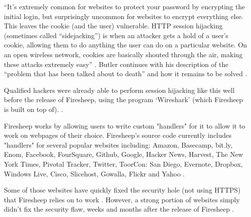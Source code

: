 \documentclass[11pt]{article}
\begin{document}
\begin{multicols}{2}
``It's extremely common for websites to protect your password by encrypting the initial login, but surprisingly uncommon for websites to encrypt everything else. This leaves the cookie (and the user) vulnerable. HTTP session hijacking (sometimes called ``sidejacking'') is when an attacker gets a hold of a user's cookie, allowing them to do anything the user can do on a particular website. On an open wireless network, cookies are basically shouted through the air, making these attacks extremely easy'' \cite{eric-butler}. Butler continues with his description of the ``problem that has been talked about to death'' and how it remains to be solved \cite{eric-butler}. 

Qualified hackers were already able to perform session hijacking like this well before the release of Firesheep, using the program `Wireshark' (which Firesheep is built on top of). \cite{wireshark}.

Firesheep works by allowing users to write custom "handlers" for it to allow it to work on webpages of their choice. Firesheep's source code currently includes "handlers" for several popular websites including: Amazon, Basecamp, bit.ly, Enom, Facebook, FourSquare, Github, Google, Hacker News, Harvest, The New York Times, Pivotal Tracker, Twitter, ToorCon: San Diego, Evernote, Dropbox, Windows Live, Cisco, Slicehost, Gowalla, Flickr and Yahoo \cite{firesheep-source}. 

Some of those websites have quickly fixed the security hole (not using HTTPS) that Firesheep relies on to work \cite{butler-fallout}. However, a strong portion of websites simply didn't fix the security flaw, weeks and months after the release of Firesheep \cite{butler-fallout}.







\end{multicols}
\end{document}
